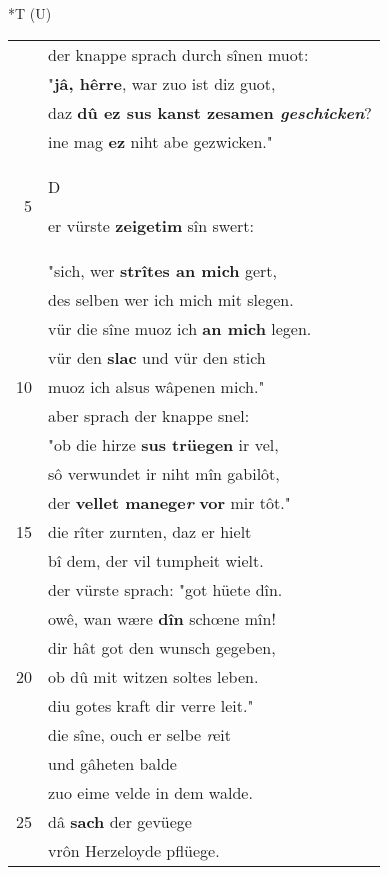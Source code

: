 \documentclass[8pt,a4paper,notitlepage]{article}
\begin{document}
\begin{table}[ht]
\begin{minipage}[t]{0.5\linewidth}
\end{minipage}
\hspace{0.5cm}
\begin{minipage}[t]{0.5\linewidth}
\small
\begin{center}*T (U)
\end{center}
\begin{tabular}{rl}
 & der knappe sprach durch sînen muot:\\ 
 & "\textbf{jâ, hêrre}, war zuo ist diz guot,\\ 
 & daz \textbf{dû ez sus kanst zesamen \textit{geschicken}}?\\ 
 & ine mag \textbf{ez} niht abe gezwicken."\\ 
5 & \begin{large}D\end{large}er vürste \textbf{zeigetim} sîn swert:\\ 
 & "sich, wer \textbf{strîtes an mich} gert,\\ 
 & des selben wer ich mich mit slegen.\\ 
 & vür die sîne muoz ich \textbf{an mich} legen.\\ 
 & vür den \textbf{slac} und vür den stich\\ 
10 & muoz ich alsus wâpenen mich."\\ 
 & aber sprach der knappe snel:\\ 
 & "ob die hirze \textbf{sus trüegen} ir vel,\\ 
 & sô verwundet ir niht mîn gabilôt,\\ 
 & der \textbf{vellet manege\textit{r}} \textbf{vor} mir tôt."\\ 
15 & die rîter zurnten, daz er hielt\\ 
 & bî dem, der vil tumpheit wielt.\\ 
 & der vürste sprach: "got hüete dîn.\\ 
 & owê, wan wære \textbf{dîn} schœne mîn!\\ 
 & dir hât got den wunsch gegeben,\\ 
20 & ob dû mit witzen soltes leben.\\ 
 & diu gotes kraft dir verre leit."\\ 
 & die sîne, ouch er selbe \textit{r}eit\\ 
 & und gâheten balde\\ 
 & zuo eime velde in dem walde.\\ 
25 & dâ \textbf{sach} der gevüege\\ 
 & vrôn Herzeloyde pflüege.\\ 

\end{tabular}
\end{minipage}
\end{table}
\end{document}
